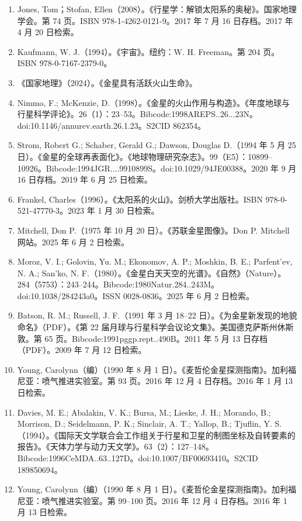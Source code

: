 \begin{enumerate}
\item Jones, Tom；Stofan, Ellen（2008）。《行星学：解锁太阳系的奥秘》。国家地理学会。第 74 页。ISBN 978-1-4262-0121-9。2017 年 7 月 16 日存档。2017 年 4 月 20 日检索。
\item Kaufmann, W. J.（1994）。《宇宙》。纽约：W. H. Freeman。第 204 页。ISBN 978-0-7167-2379-0。
\item 《国家地理》（2024）。《金星具有活跃火山生命》。
\item Nimmo, F.; McKenzie, D.（1998）。《金星的火山作用与构造》。《年度地球与行星科学评论》。26（1）：23–53。Bibcode:1998AREPS..26...23N。doi:10.1146/annurev.earth.26.1.23。S2CID 862354。
\item Strom, Robert G.; Schaber, Gerald G.; Dawson, Douglas D.（1994 年 5 月 25 日）。《金星的全球再表面化》。《地球物理研究杂志》。99（E5）：10899–10926。Bibcode:1994JGR....9910899S。doi:10.1029/94JE00388。2020 年 9 月 16 日存档。2019 年 6 月 25 日检索。
\item Frankel, Charles（1996）。《太阳系的火山》。剑桥大学出版社。ISBN 978-0-521-47770-3。2023 年 1 月 30 日检索。
\item Mitchell, Don P.（1975 年 10 月 20 日）。《苏联金星图像》。Don P. Mitchell 网站。2025 年 6 月 2 日检索。
\item Moroz, V. I.; Golovin, Yu. M.; Ekonomov, A. P.; Moshkin, B. E.; Parfent'ev, N. A.; San'ko, N. F.（1980）。《金星白天天空的光谱》。《自然》（Nature）。284（5753）：243–244。Bibcode:1980Natur.284..243M。doi:10.1038/284243a0。ISSN 0028-0836。2025 年 6 月 2 日检索。
\item Batson, R. M.; Russell, J. F.（1991 年 3 月 18–22 日）。《为金星新发现的地貌命名》（PDF）。《第 22 届月球与行星科学会议论文集》。美国德克萨斯州休斯敦。第 65 页。Bibcode:1991pggp.rept..490B。2011 年 5 月 13 日存档（PDF）。2009 年 7 月 12 日检索。
\item Young, Carolynn（编）（1990 年 8 月 1 日）。《麦哲伦金星探测指南》。加利福尼亚：喷气推进实验室。第 93 页。2016 年 12 月 4 日存档。2016 年 1 月 13 日检索。
\item Davies, M. E.; Abalakin, V. K.; Bursa, M.; Lieske, J. H.; Morando, B.; Morrison, D.; Seidelmann, P. K.; Sinclair, A. T.; Yallop, B.; Tjuflin, Y. S.（1994）。《国际天文学联合会工作组关于行星和卫星的制图坐标及自转要素的报告》。《天体力学与动力天文学》。63（2）：127–148。Bibcode:1996CeMDA..63..127D。doi:10.1007/BF00693410。S2CID 189850694。
\item Young, Carolynn（编）（1990 年 8 月 1 日）。《麦哲伦金星探测指南》。加利福尼亚：喷气推进实验室。第 99–100 页。2016 年 12 月 4 日存档。2016 年 1 月 13 日检索。

\end{enumerate}
